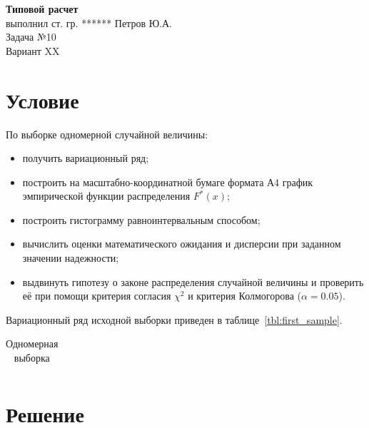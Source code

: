 \documentclass[14pt,hidelinks]{extarticle}
\begin{document}


\begin{center}
	\textbf{Типовой расчет} \\ 
	выполнил ст. гр. ****** Петров Ю.А. \\
        Задача №10\\
	Вариант XX 
\end{center}

\section{Условие}

По выборке одномерной случайной величины:

\begin{itemize}
	\item получить вариационный ряд;
	\item построить на масштабно-координатной бумаге формата А4 график эмпирической функции распределения $ F^*(x) $; 
	\item построить гистограмму равноинтервальным способом;
	\item вычислить оценки математического ожидания и дисперсии при заданном значении надежности;
	\item выдвинуть гипотезу о законе распределения случайной величины и проверить её при помощи критерия согласия $ \chi^2 $ и критерия Колмогорова ($ \alpha = 0.05 $).
\end{itemize}

Вариационный ряд исходной выборки приведен в таблице~\ref{tbl:first_sample}.

\renewcommand{\tabcolsep}{0.6em} 
\begin{table}[h!]
	\centering
	\caption{Одномерная выборка\label{tbl:first_sample}}
	\label{tbl:first}
	\begin{tabular}{cccccccccc}
		
	\end{tabular}
\end{table}

\newpage

\section{Решение}
\end{document}
